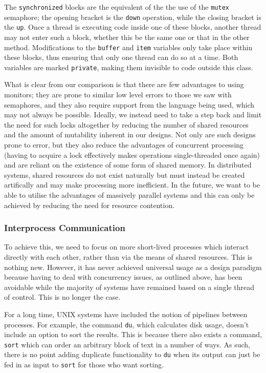 The \texttt{synchronized} blocks are the equivalent of the the use of
the \texttt{mutex} semaphore; the opening bracket is the \texttt{down}
operation, while the closing bracket is the \texttt{up}.  Once a
thread is executing code inside one of these blocks, another thread
may not enter such a block, whether this be the same one or that in
the other method.  Modifications to the \texttt{buffer} and
\texttt{item} variables only take place within these blocks, thus
ensuring that only one thread can do so at a time.  Both variables are
marked \texttt{private}, making them invisible to code outside this
class.

What is clear from our comparison is that there are few advantages to
using monitors; they are prone to similar low level errors to those we
saw with semaphores, and they also require support from the language
being used, which may not always be possible.  Ideally, we instead
need to take a step back and limit the need for such locks altogether
by reducing the number of shared resources and the amount of
mutability inherent in our designs.  Not only are such designs prone
to error, but they also reduce the advantages of concurrent processing
(having to acquire a lock effectively makes operations single-threaded
once again) and are reliant on the existence of some form of shared
memory.  In distributed systems, shared resources do not exist
naturally but must instead be created artifically and may make
processing more inefficient.  In the future, we want to be able to
utilise the advantages of massively parallel systems and this can only
be achieved by reducing the need for resource contention.

\subsubsection{Interprocess Communication}

To achieve this, we need to focus on more short-lived processes which
interact directly with each other, rather than via the means of shared
resources.  This is nothing new.  However, it has never achieved
universal usage as a design paradigm because having to deal with
concurrency issues, as outlined above, has been avoidable while the
majority of systems have remained based on a single thread of control.
This is no longer the case.

For a long time, UNIX systems have included the notion of pipelines
between processes.  For example, the command \texttt{du}, which
calculates disk usage, doesn't include an option to sort the results.
This is because there also exists a command, \texttt{sort} which can
order an arbitrary block of text in a number of ways.  As such, there
is no point adding duplicate functionality to \texttt{du} when its
output can just be fed in as input to \texttt{sort} for those who want
sorting.

